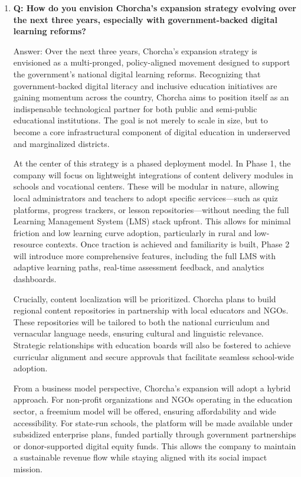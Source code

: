 \documentclass[12pt,a4paper,oneside]{book}
\begin{document}
\begin{enumerate}
\item \textbf{Q: How do you envision Chorcha's expansion strategy evolving over the next three years, especially with government-backed digital learning reforms?}

Answer: Over the next three years, Chorcha’s expansion strategy is envisioned as a multi-pronged, policy-aligned movement designed to support the government’s national digital learning reforms. Recognizing that government-backed digital literacy and inclusive education initiatives are gaining momentum across the country, Chorcha aims to position itself as an indispensable technological partner for both public and semi-public educational institutions. The goal is not merely to scale in size, but to become a core infrastructural component of digital education in underserved and marginalized districts.

At the center of this strategy is a phased deployment model. In Phase 1, the company will focus on lightweight integrations of content delivery modules in schools and vocational centers. These will be modular in nature, allowing local administrators and teachers to adopt specific services—such as quiz platforms, progress trackers, or lesson repositories—without needing the full Learning Management System (LMS) stack upfront. This allows for minimal friction and low learning curve adoption, particularly in rural and low-resource contexts. Once traction is achieved and familiarity is built, Phase 2 will introduce more comprehensive features, including the full LMS with adaptive learning paths, real-time assessment feedback, and analytics dashboards.

Crucially, content localization will be prioritized. Chorcha plans to build regional content repositories in partnership with local educators and NGOs. These repositories will be tailored to both the national curriculum and vernacular language needs, ensuring cultural and linguistic relevance. Strategic relationships with education boards will also be fostered to achieve curricular alignment and secure approvals that facilitate seamless school-wide adoption.


From a business model perspective, Chorcha’s expansion will adopt a hybrid approach. For non-profit organizations and NGOs operating in the education sector, a freemium model will be offered, ensuring affordability and wide accessibility. For state-run schools, the platform will be made available under subsidized enterprise plans, funded partially through government partnerships or donor-supported digital equity funds. This allows the company to maintain a sustainable revenue flow while staying aligned with its social impact mission.



\end{enumerate}
\end{document}
